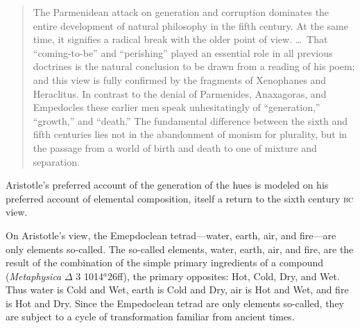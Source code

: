 \begin{quote}
	The Parmenidean attack on generation and corruption dominates the entire development of natural philosophy in the fifth century. At the same time, it signifies a radical break with the older point of view. \ldots\ That ``coming-to-be'' and ``perishing'' played an essential role in all previous doctrines is the natural conclusion to be drawn from a reading of his poem; and this view is fully confirmed by the fragments of Xenophanes and Heraclitus. In contrast to the denial of Parmenides, Anaxagoras, and Empedocles these earlier men speak unhesitatingly of ``generation,'' ``growth,'' and ``death.'' The fundamental difference between the sixth and fifth centuries lies not in the abandonment of monism for plurality, but in the passage from a world of birth and death to one of mixture and separation. \citep[154--155]{Kahn:1994qf}
\end{quote}
Aristotle's preferred account of the generation of the hues is modeled on his preferred account of elemental composition, itself a return to the sixth century \textsc{bc} view.

On Aristotle's view, the Emepdoclean tetrad---water, earth, air, and fire---are only elements so-called. The so-called elements, water, earth, air, and fire, are the result of the combination of the simple primary ingredients of a compound (\emph{Metaphysica} \( \Delta \) 3 1014\( ^{a} \)26ff), the primary opposites: Hot, Cold, Dry, and Wet. Thus water is Cold and Wet, earth is Cold and Dry, air is Hot and Wet, and fire is Hot and Dry. Since the Empedoclean tetrad are only elements so-called, they are subject to a cycle of transformation familiar from ancient times.

